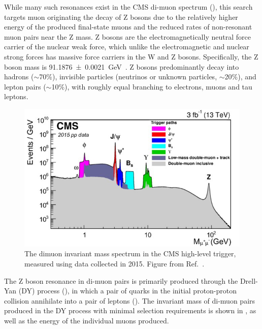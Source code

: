 While many such resonances exist in the CMS di-muon spectrum (), this search targets muon originating the decay of Z bosons due to the relatively higher energy of the produced final-state muons and the reduced rates of non-resonant muon pairs near the Z mass.
Z bosons are the electromagnetically neutral force carrier of the nuclear weak force, which unlike the electromagnetic and nuclear strong forces has massive force carriers in the W and Z bosons.
Specifically, the Z boson mass is \SI{91.1876\pm0.0021}{\giga\eV}~\cite{pdg}. 
Z bosons predominantly decay into hadrons ($\sim$70$\%$), invisible particles (neutrinos or unknown particles, $\sim$20$\%$), and lepton pairs ($\sim$10$\%$), with roughly equal branching to electrons, muons and tau leptons.

\begin{figure}[ht]
	\centering
	\includegraphics[width=\textwidth]{figures/cms_diMuonSpectrum.jpg}
	\caption[Inclusive dimuon spectrum in CMS]{The dimuon invariant mass spectrum in the CMS high-level trigger, measured using data collected in 2015. Figure from Ref.~\cite{cmsMuonPerformance}.}
	\label{fig:diMuonSpectrum}
\end{figure}

The Z boson resonance in di-muon pairs is primarily produced through the Drell-Yan (DY) process (\cite{origDYPaper,DYSummary}), in which a pair of quarks in the initial proton-proton collision annihilate into a pair of leptons ().
The invariant mass of di-muon pairs produced in the DY process with minimal selection requirements is shown in , as well as the energy of the individual muons produced. 

